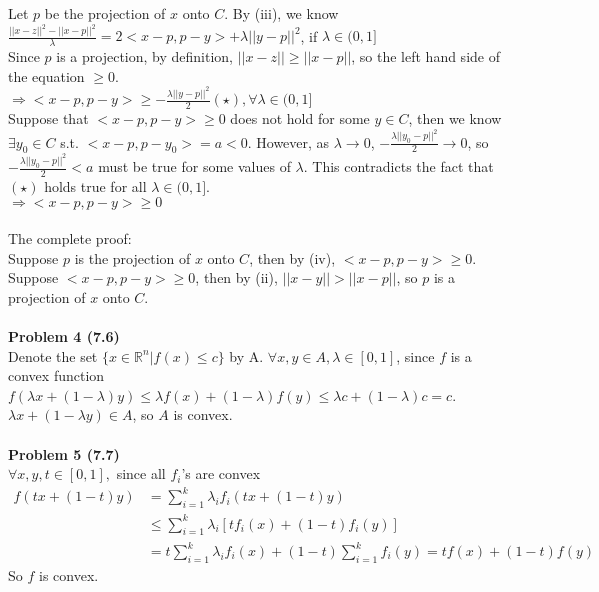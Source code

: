 \documentclass[letterpaper,12pt]{article}
\theoremstyle{definition}
\begin{document}
Let $p$ be the projection of $x$ onto $C$. By (iii), we know\\
$\frac{||x-z||^2-||x-p||^2}{\lambda} = 2<x-p, p-y>+\lambda||y-p||^2$, if $\lambda \in (0, 1]$\\
Since $p$ is a projection, by definition, $||x-z||\geq ||x-p||$, so the left hand side of the equation $\geq 0$.\\
$\Rightarrow <x-p, p-y> \geq -\frac{\lambda||y-p||^2}{2}(\star), \forall \lambda\in (0, 1]$\\
Suppose that $<x-p, p-y>\geq 0$ does not hold for some $y\in C$, then we know $\exists y_0\in C$ s.t. $<x-p, p-y_0> = a<0$. However, as $\lambda\rightarrow 0$, $-\frac{\lambda||y_0-p||^2}{2}\rightarrow 0$, so $-\frac{\lambda||y_0-p||^2}{2}<a$ must be true for some values of $\lambda$. This contradicts the fact that $(\star)$ holds true for all $\lambda \in (0,1]$.  \\
$\Rightarrow <x-p, p-y>\geq 0$\\
\\
The complete proof:\\
Suppose $p$ is the projection of $x$ onto $C$, then by (iv), $<x-p, p-y>\geq 0$.\\
Suppose $<x-p, p-y>\geq 0$, then by (ii), $||x-y||>||x-p||$, so $p$ is a projection of $x$ onto $C$.\\
\\
\noindent\textbf{Problem 4 (7.6)} \\
Denote the set $\{x\in \mathbb{R}^n|f(x)\leq c\}$ by A. $\forall x, y\in A, \lambda\in [0, 1]$, since $f$ is a convex function\\
$f(\lambda x + (1-\lambda) y)\leq \lambda f(x) + (1-\lambda)f(y) \leq \lambda c + (1-\lambda)c = c$.\\
$\lambda x + (1-\lambda y)\in A$, so $A$ is convex.\\
\\
\noindent\textbf{Problem 5 (7.7)} \\
$\forall x, y, t\in [0,1],$ since all $f_i$'s are convex\\
\begin{align*}
f(tx + (1-t)y) &= \sum_{i=1}^k \lambda_if_i(tx+(1-t)y)\\
&\leq \sum_{i=1}^k \lambda_i[tf_i(x) + (1-t)f_i(y)]\\
&= t\sum_{i=1}^k \lambda_i f_i(x)+(1-t)\sum_{i=1}^k f_i(y) = tf(x)+(1-t)f(y)
\end{align*}
So $f$ is convex.\\
\\
\end{document}
